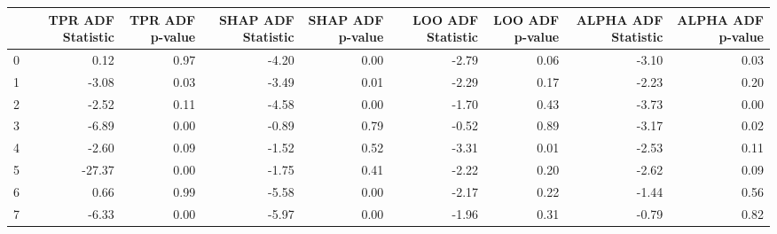\begin{tabular}{lrrrrrrrr}
\toprule
 & TPR ADF Statistic & TPR ADF p-value & SHAP ADF Statistic & SHAP ADF p-value & LOO ADF Statistic & LOO ADF p-value & ALPHA ADF Statistic & ALPHA ADF p-value \\
\midrule
0 & 0.12 & 0.97 & -4.20 & 0.00 & -2.79 & 0.06 & -3.10 & 0.03 \\
1 & -3.08 & 0.03 & -3.49 & 0.01 & -2.29 & 0.17 & -2.23 & 0.20 \\
2 & -2.52 & 0.11 & -4.58 & 0.00 & -1.70 & 0.43 & -3.73 & 0.00 \\
3 & -6.89 & 0.00 & -0.89 & 0.79 & -0.52 & 0.89 & -3.17 & 0.02 \\
4 & -2.60 & 0.09 & -1.52 & 0.52 & -3.31 & 0.01 & -2.53 & 0.11 \\
5 & -27.37 & 0.00 & -1.75 & 0.41 & -2.22 & 0.20 & -2.62 & 0.09 \\
6 & 0.66 & 0.99 & -5.58 & 0.00 & -2.17 & 0.22 & -1.44 & 0.56 \\
7 & -6.33 & 0.00 & -5.97 & 0.00 & -1.96 & 0.31 & -0.79 & 0.82 \\
\bottomrule
\end{tabular}
